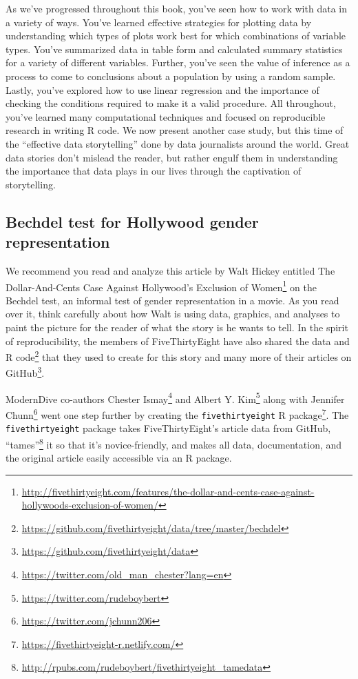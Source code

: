\documentclass[12pt, krantz2,]{krantz}
\renewcommand{\href}[2]{#2\footnote{\url{#1}}}
\begin{document}
As we've progressed throughout this book, you've seen how to work with data in a variety of ways. You've learned effective strategies for plotting data by understanding which types of plots work best for which combinations of variable types. You've summarized data in table form and calculated summary statistics for a variety of different variables. Further, you've seen the value of inference as a process to come to conclusions about a population by using a random sample. Lastly, you've explored how to use linear regression and the importance of checking the conditions required to make it a valid procedure. All throughout, you've learned many computational techniques and focused on reproducible research in writing R code. We now present another case study, but this time of the ``effective data storytelling'' done by data journalists around the world. Great data stories don't mislead the reader, but rather engulf them in understanding the importance that data plays in our lives through the captivation of storytelling.

\hypertarget{bechdel-test-for-hollywood-gender-representation}{%
\subsection{Bechdel test for Hollywood gender representation}\label{bechdel-test-for-hollywood-gender-representation}}

We recommend you read and analyze this article by Walt Hickey entitled \href{http://fivethirtyeight.com/features/the-dollar-and-cents-case-against-hollywoods-exclusion-of-women/}{The Dollar-And-Cents Case Against Hollywood's Exclusion of Women} on the Bechdel test, an informal test of gender representation in a movie. As you read over it, think carefully about how Walt is using data, graphics, and analyses to paint the picture for the reader of what the story is he wants to tell. In the spirit of reproducibility, the members of FiveThirtyEight have also shared the \href{https://github.com/fivethirtyeight/data/tree/master/bechdel}{data and R code} that they used to create for this story and many more of their articles on \href{https://github.com/fivethirtyeight/data}{GitHub}.

ModernDive co-authors \href{https://twitter.com/old_man_chester?lang=en}{Chester Ismay} and \href{https://twitter.com/rudeboybert}{Albert Y. Kim} along with \href{https://twitter.com/jchunn206}{Jennifer Chunn} went one step further by creating the \href{https://fivethirtyeight-r.netlify.com/}{\texttt{fivethirtyeight} R package}. The \texttt{fivethirtyeight} package takes FiveThirtyEight's article data from GitHub, \href{http://rpubs.com/rudeboybert/fivethirtyeight_tamedata}{``tames''} it so that it's novice-friendly, and makes all data, documentation, and the original article easily accessible via an R package.
\end{document}
